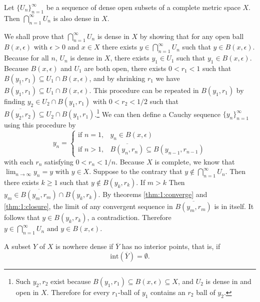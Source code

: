 \documentclass[nobib,notoc]{tufte-handout}
\begin{document}
\begin{thm}
	Let \(\{U_n\}_{n=1}^{\infty}\) be a sequence of dense open subsets of a complete metric space \(X\). Then \(\bigcap_{n=1}^{\infty}U_n\) is also dense in \(X\).
	\begin{IEEEproof}
		We shall prove that \(\bigcap_{n=1}^{\infty}U_n\) is dense in \(X\) by showing that for any open ball \(B(x,\epsilon)\) with \(\epsilon>0\) and \(x\in X\)  there exists \(y\in\bigcap_{n=1}^{\infty}U_n\) such that \(y\in B(x,\epsilon)\).\bigbreak
		Because for all \(n\), \(U_n\) is dense in \(X\), there exists \(y_1\in U_1\) such that \(y_1\in B(x,\epsilon)\). Because \(B(x,\epsilon)\) and \(U_1\) are both open, there exists \(0<r_1<1\) such that \(B(y_1,r_1)\subseteq U_1\cap B(x,\epsilon)\), and by shrinking \(r_1\) we have \(\overline{B(y_1,r_1)}\subseteq U_1\cap B(x,\epsilon)\). This procedure can be repeated in \(B(y_1,r_1)\) by finding \(y_2\in U_2\cap B(y_1,r_1)\) with \(0<r_2<1/2\) such that \(\overline{B(y_2,r_2)}\subseteq U_2\cap B(y_1,r_1)\).\footnote{Such \(y_2,r_2\) exist because \(B(y_1,r_1)\subseteq B(x,\epsilon)\subseteq X\), and \(U_2\) is dense in and open in \(X\). Therefore for every \(r_1\)-ball of \(y_1\) contains an \(r_2\) ball of \(y_2\).} We can then define a Cauchy sequence \(\{y_n\}_{n=1}^{\infty}\) using this procedure by
		\begin{equation*}
			y_n=\begin{cases}
				\text{if }n=1,&y_n\in B(x,\epsilon)\\
				\text{if }n>1,&\overline{B(y_n,r_n)}\subseteq B(y_{n-1}, r_{n-1})
			\end{cases}
		\end{equation*}
		with each \(r_n\) satisfying \(0<r_n<1/n\). Because \(X\) is complete, we know that \(\lim_{n\rightarrow\infty}y_n=y\) with \(y\in X\). Suppose to the contrary that \(y\notin\bigcap_{n=1}^{\infty}U_n\). Then there exists \(k\geq 1\) such that \(y\notin B(y_k,r_k)\). If \(m>k\) Then \(y_m\in \overline{B(y_m,r_m)}\cap B(y_k,r_k)\). By theorems \ref{thm:1:converge} and \ref{thm:1:closure}, the limit of any convergent sequence in \(\overline{B(y_m,r_m)}\) is in itself. It follows that \(y\in B(y_k,r_k)\), a contradiction. Therefore \(y\in\bigcap_{n=1}^{\infty}U_n\text{ and } y\in B(x,\epsilon)\).
	\end{IEEEproof}
\end{thm}
\begin{defi}
	A subset \(Y\) of \(X\) is nowhere dense if \(\overline{Y}\) has no interior points, that is, if
	\begin{equation*}
		\text{int}(\overline{Y})=\emptyset.
	\end{equation*}
\end{defi}
\end{document}
